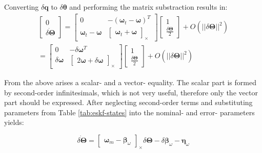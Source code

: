 Converting $\delta\mathbf{q}$ to $\delta\boldsymbol{\theta}$ and performing the matrix substraction results in:
\begin{equation}
\begin{aligned}
    \begin{bmatrix}
        0 \\ \dot{\delta\boldsymbol{\Theta}}
    \end{bmatrix} = 
    \begin{bmatrix}
        0 & -(\boldsymbol{\omega}_t-\boldsymbol{\omega})^T \\
        \boldsymbol{\omega}_t-\boldsymbol{\omega} & \begin{bmatrix}\boldsymbol{\omega}_t+\boldsymbol{\omega}\end{bmatrix}_\times
    \end{bmatrix}
    \begin{bmatrix}
        1 \\ \frac{\delta\boldsymbol{\Theta}}{2}
    \end{bmatrix}+O(||\delta\boldsymbol{\Theta}||^2) \\
    =\begin{bmatrix}
        0 & -\delta\boldsymbol{\omega}^T \\
        \delta\boldsymbol{\omega} & \begin{bmatrix}2\boldsymbol{\omega}+\delta\boldsymbol{\omega}\end{bmatrix}_\times
    \end{bmatrix}
    \begin{bmatrix}
        1 \\ \frac{\delta\boldsymbol{\Theta}}{2}
    \end{bmatrix}+O(||\delta\boldsymbol{\Theta}||^2)
\end{aligned}
\end{equation}

From the above arises a scalar- and a vector- equality. The scalar part is formed by second-order infinitesimals, which is not very useful, therefore only the vector part should be expressed. After neglecting second-order terms and substituting parameters from Table \ref{tab:eskf-states} into the nominal- and error- parameters yields:

\begin{tcolorbox}
\begin{equation}
    \dot{\delta\boldsymbol{\Theta}}=\begin{bmatrix}
        \boldsymbol{\omega}_m-\boldsymbol{\beta}_\omega
    \end{bmatrix}_\times \delta\boldsymbol{\Theta}-\delta\boldsymbol{\beta}_\omega-\boldsymbol{\eta}_\omega
\end{equation}
\end{tcolorbox}

